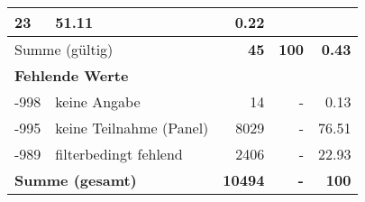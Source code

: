 \begin{longtable}{lXrrr}
       \num{23} &
       \num[round-mode=places,round-precision=2]{51.11} &
         \num[round-mode=places,round-precision=2]{0.22} \\
     \midrule
     \multicolumn{2}{l}{Summe (gültig)} &
       \textbf{\num{45}} &
     \textbf{\num{100}} &
       \textbf{\num[round-mode=places,round-precision=2]{0.43}} \\
     \multicolumn{5}{l}{\textbf{Fehlende Werte}}\\
       -998 &
       keine Angabe &
         \num{14} &
        - &
         \num[round-mode=places,round-precision=2]{0.13} \\
       -995 &
       keine Teilnahme (Panel) &
         \num{8029} &
        - &
         \num[round-mode=places,round-precision=2]{76.51} \\
       -989 &
       filterbedingt fehlend &
         \num{2406} &
        - &
         \num[round-mode=places,round-precision=2]{22.93} \\
     \midrule
     \multicolumn{2}{l}{\textbf{Summe (gesamt)}} &
          \textbf{\num{10494}} &
        \textbf{-} &
        \textbf{\num{100}} \\
     \bottomrule
     \end{longtable}
     
